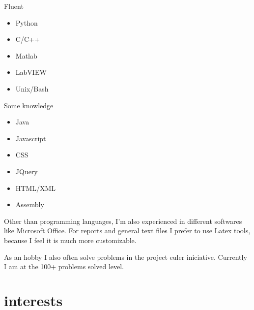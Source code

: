 \documentclass[]{friggeri-cv} %
\begin{document}
\setlength{\columnsep}{0cm}
\begin{multicols}{2}
	Fluent
	\begin{itemize} \itemsep0.5pt \parskip-1pt 
		\item Python
		\item C/C++
		\item Matlab
		\item LabVIEW
		\item Unix/Bash
	\end{itemize}
	Some knowledge
	\begin{itemize}
		\item Java
		\item Javascript
		\item CSS
		\item JQuery
		\item HTML/XML
		\item Assembly
	\end{itemize}
\end{multicols}


Other than programming languages, I'm also experienced in different softwares like Microsoft Office. For reports and general text files I prefer to use Latex tools, because I feel it is much more customizable.   

As an hobby I also often solve problems in the project euler iniciative. Currently I am at the 100+ problems solved level.





\newpage

\section{interests}



\end{document}
